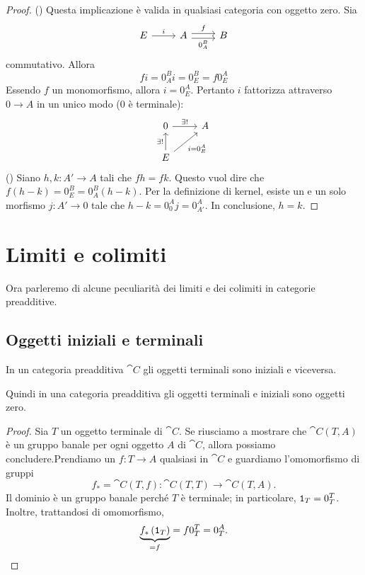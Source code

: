 \begin{proof}
  (\Rightarrow) Questa implicazione è valida in qualsiasi categoria con
  oggetto zero. Sia
  \[
    \begin{tikzcd}
      E \ar["{i}", r] & A \ar["{f}", r, shift left] \ar["{0_A^B}", r,
      shift right, swap] & B
    \end{tikzcd}
  \]
  commutativo. Allora
  \[
    f i = 0_A^B i = 0_E^B = f 0_E^A
  \]
  Essendo \(f\) un monomorfismo, allora \(i = 0_E^A\). Pertanto \(i\)
  fattorizza attraverso \(0 \to A\) in un unico modo (\(0\) è terminale):
  \[
    \begin{tikzcd}
      0 \ar["{\exists!}", r] & A \\
      E \ar["{\exists!}", u] \ar["{i = 0_E^A}", ur, swap]
    \end{tikzcd}
  \]
  (\Leftarrow) Siano \(h, k : A' \to A\) tali che \(f h = f k\). Questo
  vuol dire che \(f (h-k) = 0_E^B = 0_A^B (h-k)\). Per la definizione di
  kernel, esiste un e un solo morfismo \(j : A' \to 0\) tale che
  \(h-k = 0_0^A j = 0_{A'}^A\). In conclusione, \(h = k\).
\end{proof}


\section{Limiti e colimiti}

Ora parleremo di alcune peculiarità dei limiti e dei colimiti in
categorie preadditive.


\subsection{Oggetti iniziali e terminali}

\begin{proposition}
  In un categoria preadditiva \(\cat C\) gli oggetti terminali sono
  iniziali e viceversa.
\end{proposition}

Quindi in una categoria preadditiva gli oggetti terminali e iniziali
sono oggetti zero.

\begin{proof}
  Sia \(T\) un oggetto terminale di \(\cat C\). Se riusciamo a mostrare
  che \(\cat C(T, A)\) è un gruppo banale per ogni oggetto \(A\) di
  \(\cat C\), allora possiamo concludere.\newline Prendiamo un
  \(f : T \to A\) qualsiasi in \(\cat C\) e guardiamo l'omomorfismo di
  gruppi
  \[
    f_\ast = \cat C(T, f) : \cat C(T, T) \to \cat C(T, A) .
  \]
  Il dominio è un gruppo banale perché \(T\) è terminale; in
  particolare, \(\mathtt 1_T = 0_T^T\). Inoltre, trattandosi di omomorfismo,
  \[
    \underbrace{f_\ast \left(\id_T\right)}_{= f} = f 0_T^T = 0_T^A
    . \qedhere
  \]
\end{proof}


